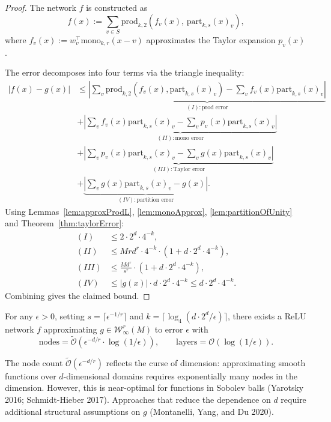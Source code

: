\begin{proof}
  The network $f$ is constructed as
  \[
    f(x) := \sum_{v \in S} \mathrm{prod}_{k,2}(f_v(x),\, \mathrm{part}_{k,s}(x)_v),
  \]
  where $f_v(x) := w_v^\top \mathrm{mono}_{k,r}(x - v)$ approximates the Taylor expansion $p_v(x)$.

  The error decomposes into four terms via the triangle inequality:
  \begin{align*}
    |f(x) - g(x)|
    &\leq \underbrace{\left|\sum_v \mathrm{prod}_{k,2}(f_v(x), \mathrm{part}_{k,s}(x)_v)
        - \sum_v f_v(x) \mathrm{part}_{k,s}(x)_v\right|}_{(I): \text{prod error}} \\
    &+ \underbrace{\left|\sum_v f_v(x) \mathrm{part}_{k,s}(x)_v
        - \sum_v p_v(x) \mathrm{part}_{k,s}(x)_v\right|}_{(II): \text{mono error}} \\
    &+ \underbrace{\left|\sum_v p_v(x) \mathrm{part}_{k,s}(x)_v
        - \sum_v g(x) \mathrm{part}_{k,s}(x)_v\right|}_{(III): \text{Taylor error}} \\
    &+ \underbrace{\left|\sum_v g(x) \mathrm{part}_{k,s}(x)_v - g(x)\right|}_{(IV): \text{partition error}}.
  \end{align*}
  Using Lemmas~\ref{lem:approxProdL}, \ref{lem:monoApprox}, \ref{lem:partitionOfUnity}
  and Theorem~\ref{thm:taylorError}:
  \begin{align*}
    (I) &\leq 2 \cdot 2^d \cdot 4^{-k}, \\
    (II) &\leq Mrd^r \cdot 4^{-k} \cdot (1 + d \cdot 2^d \cdot 4^{-k}), \\
    (III) &\leq \frac{Md^r}{s^r} \cdot (1 + d \cdot 2^d \cdot 4^{-k}), \\
    (IV) &\leq |g(x)| \cdot d \cdot 2^d \cdot 4^{-k} \leq d \cdot 2^d \cdot 4^{-k}.
  \end{align*}
  Combining gives the claimed bound.
\end{proof}

\begin{corollary}\label{cor:sobolevOptimal}
For any $\epsilon > 0$, setting $s = \lceil \epsilon^{-1/r} \rceil$ and $k = \lceil \log_4(d \cdot 2^d / \epsilon) \rceil$,
there exists a ReLU network $f$ approximating $g \in \mathcal{W}^r_\infty(M)$ to error $\epsilon$ with
\[
  \text{nodes} = \tilde{\mathcal{O}}\!\left(\epsilon^{-d/r} \cdot \log(1/\epsilon)\right),
  \qquad
  \text{layers} = \mathcal{O}(\log(1/\epsilon)).
\]
\end{corollary}

\begin{remark}\label{rem:curse_dimension}
  The node count $\tilde{\mathcal{O}}(\epsilon^{-d/r})$ reflects the curse of dimension:
  approximating smooth functions over $d$-dimensional domains requires exponentially many
  nodes in the dimension. However, this is near-optimal for functions in Sobolev balls
  (Yarotsky 2016; Schmidt-Hieber 2017). Approaches that reduce the dependence on $d$
  require additional structural assumptions on $g$ (Montanelli, Yang, and Du 2020).
\end{remark}
